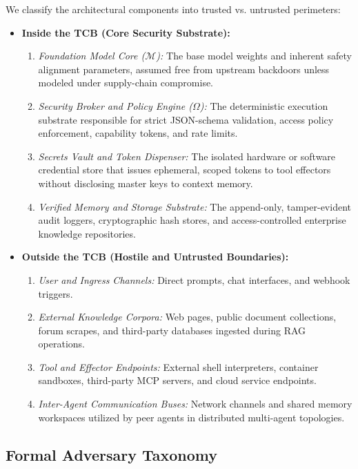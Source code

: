 We classify the architectural components into trusted vs. untrusted perimeters:
\begin{itemize}
    \item \textbf{Inside the TCB (Core Security Substrate):}
    \begin{enumerate}
        \item \textit{Foundation Model Core ($\mathcal{M}$):} The base model weights and inherent safety alignment parameters, assumed free from upstream backdoors unless modeled under supply-chain compromise.
        \item \textit{Security Broker and Policy Engine ($\Omega$):} The deterministic execution substrate responsible for strict JSON-schema validation, access policy enforcement, capability tokens, and rate limits.
        \item \textit{Secrets Vault and Token Dispenser:} The isolated hardware or software credential store that issues ephemeral, scoped tokens to tool effectors without disclosing master keys to context memory.
        \item \textit{Verified Memory and Storage Substrate:} The append-only, tamper-evident audit loggers, cryptographic hash stores, and access-controlled enterprise knowledge repositories.
    \end{enumerate}
    \item \textbf{Outside the TCB (Hostile and Untrusted Boundaries):}
    \begin{enumerate}
        \item \textit{User and Ingress Channels:} Direct prompts, chat interfaces, and webhook triggers.
        \item \textit{External Knowledge Corpora:} Web pages, public document collections, forum scrapes, and third-party databases ingested during RAG operations.
        \item \textit{Tool and Effector Endpoints:} External shell interpreters, container sandboxes, third-party MCP servers, and cloud service endpoints.
        \item \textit{Inter-Agent Communication Buses:} Network channels and shared memory workspaces utilized by peer agents in distributed multi-agent topologies.
    \end{enumerate}
\end{itemize}

\subsection{Formal Adversary Taxonomy}
\label{subsec:adversary_classes}

